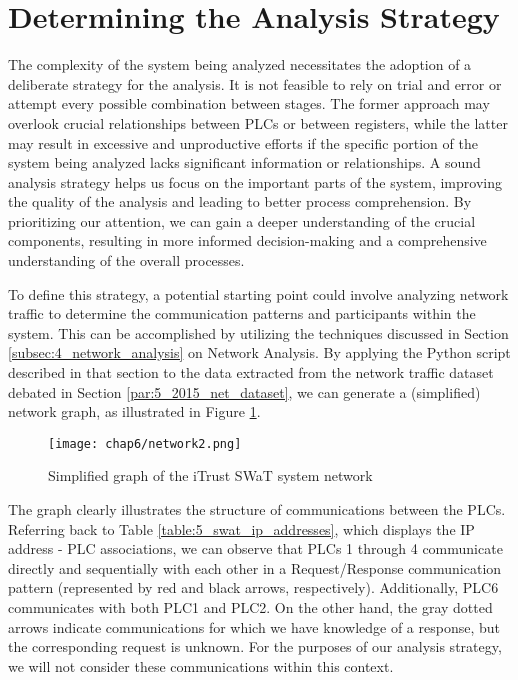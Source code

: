 \section{Determining the Analysis Strategy}
\label{sec:6_analysis_strategy}
The complexity of the system being analyzed necessitates the adoption of a deliberate strategy for the analysis. It is not feasible to rely on trial and error or attempt every possible combination between stages. The former approach may overlook crucial relationships between PLCs or between registers, while the latter may result in excessive and unproductive efforts if the specific portion of the system being analyzed lacks significant information or relationships. \newline
A sound analysis strategy helps us focus on the important parts of the system, improving the quality of the analysis and leading to better process comprehension. By prioritizing our attention, we can gain a deeper understanding of the crucial components, resulting in more informed decision-making and a comprehensive understanding of the overall processes.

\bigskip
To define this strategy, a potential starting point could involve analyzing network traffic to determine the communication patterns and participants within the system. This can be accomplished by utilizing the techniques discussed in Section \ref{subsec:4_network_analysis} on Network Analysis. By applying the Python script described in that section to the data extracted from the network traffic dataset debated in Section \ref{par:5_2015_net_dataset}, we can generate a (simplified) network graph, as illustrated in Figure \ref{fig:6_network_SWaT}.

\begin{figure}[ht]
	\centering
	\texttt{[image: chap6/network2.png]}
	\caption{Simplified graph of the iTrust SWaT system network}
	\label{fig:6_network_SWaT}
\end{figure}

The graph clearly illustrates the structure of communications between the PLCs. Referring back to Table \ref{table:5_swat_ip_addresses}, which displays the IP address - PLC associations, we can observe that PLCs 1 through 4 communicate directly and sequentially with each other in a Request/Response communication pattern (represented by red and black arrows, respectively). Additionally, PLC6 communicates with both PLC1 and PLC2. On the other hand, the gray dotted arrows indicate communications for which we have knowledge of a response, but the corresponding request is unknown. For the purposes of our analysis strategy, we will not consider these communications within this context.

